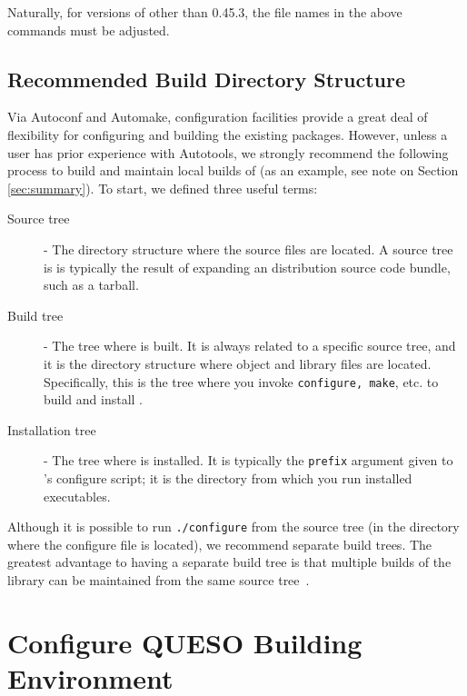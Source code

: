 Naturally, for versions of \Queso{} other than 0.45.3, the file names in the above commands must be adjusted.


\subsection{Recommended Build Directory Structure}\label{sec:Queso_tree}

Via Autoconf and Automake, \Queso{} configuration facilities provide a great deal 
of flexibility for configuring and building the existing \Queso{} packages. However,
unless a user has prior experience with Autotools, we strongly recommend
the following process to build and maintain local builds of \Queso{} (as an example, see note on Section \ref{sec:summary}).
To start, we defined three useful terms:

\begin{description}
 \item [Source tree] - The directory structure where the \Queso{} source files are located. A source
tree is is typically the result of expanding an \Queso{} distribution source code bundle, such as a tarball.%
 \item [Build tree] %
- The tree where \Queso{} is built. It is always related to a specific source tree, and it is the directory structure where object and library files are located. Specifically, this is the tree where you invoke \texttt{configure, make}, etc. to build and install \Queso{}. 
 \item [Installation tree] - The tree where \Queso{} is installed. It is typically the \texttt{prefix} argument given to \Queso{}'s configure script; it is the directory from which you run installed \Queso{} executables.
\end{description}

Although it is possible to run \verb+./configure+ from the source tree (in the directory where the configure file is located), we recommend separate build trees. The greatest advantage to having a separate build tree is that multiple builds of the library
can be maintained from the same source tree~\cite{Trilinos}. 


\section{Configure QUESO Building Environment}\label{sec:Queso_configure}


